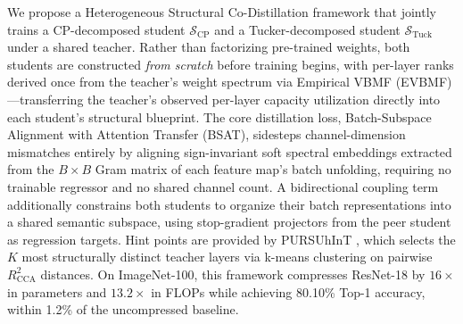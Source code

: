 \documentclass[conference]{IEEEtran}
\begin{document}
\par
We propose a Heterogeneous Structural Co-Distillation framework that jointly
trains a CP-decomposed student $\mathcal{S}_\text{CP}$ and a Tucker-decomposed
student $\mathcal{S}_\text{Tuck}$ under a shared teacher. Rather than
factorizing pre-trained weights, both students are constructed
\emph{from scratch} before training begins, with per-layer ranks derived once
from the teacher's weight spectrum via Empirical VBMF (EVBMF)
\cite{nakajima2013global}—transferring the teacher's observed per-layer
capacity utilization directly into each student's structural blueprint. The
core distillation loss, Batch-Subspace Alignment with Attention Transfer
(BSAT), sidesteps channel-dimension mismatches entirely by aligning
sign-invariant soft spectral embeddings extracted from the $B\!\times\!B$
Gram matrix of each feature map's batch unfolding, requiring no trainable
regressor and no shared channel count. A bidirectional coupling term
additionally constrains both students to organize their batch representations
into a shared semantic subspace, using stop-gradient projectors from the peer
student as regression targets. Hint points are provided by PURSUhInT
\cite{keser2023pursuhint}, which selects the $K$ most structurally distinct
teacher layers via k-means clustering on pairwise $R^2_\text{CCA}$ distances.
On ImageNet-100, this framework compresses ResNet-18 by $16\times$ in
parameters and $13.2\times$ in FLOPs while achieving 80.10\% Top-1 accuracy,
within 1.2\% of the uncompressed baseline.
\end{document}
